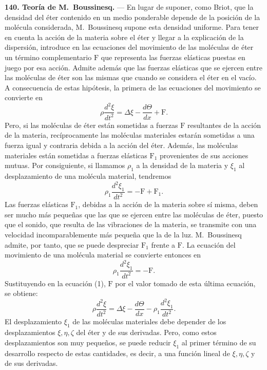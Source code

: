 \noindent\textbf{140. Teoría de M.~Boussinesq.} — En lugar de suponer,
como Briot, que la densidad del éter contenido en un medio ponderable
depende de la posición de la molécula considerada, M.~Boussinesq supone
esta densidad uniforme. Para tener en cuenta la acción de la materia sobre
el éter y llegar a la explicación de la dispersión, introduce en las
ecuaciones del movimiento de las moléculas de éter un término
complementario $\mathrm F$ que representa las fuerzas elásticas puestas en
juego por esa acción. Admite además que las fuerzas elásticas que se
ejercen entre las moléculas de éter son las mismas que cuando se considera
el éter en el vacío. A consecuencia de estas hipótesis, la primera de las
ecuaciones del movimiento se convierte en
\begin{equation}
\rho\frac{d^2\xi}{dt^2}=\Delta\xi-\frac{d\Theta}{dx}+\mathrm F.
\tag{1}
\end{equation}
Pero, si las moléculas de éter están sometidas a fuerzas $\mathrm F$
resultantes de la acción de la materia, recíprocamente las moléculas
materiales estarán sometidas a una fuerza igual y contraria debida a la
acción del éter. Además, las moléculas materiales están sometidas a
fuerzas elásticas $\mathrm F_1$ provenientes de sus acciones mutuas. Por
consiguiente, si llamamos $\rho_1$ a la densidad de la materia y $\xi_1$
al desplazamiento de una molécula material, tendremos
\[
\rho_1\frac{d^2\xi_1}{dt^2}=-\mathrm F+\mathrm F_1.
\]
Las fuerzas elásticas $\mathrm F_1$, debidas a la acción de la materia
sobre sí misma, deben ser mucho más pequeñas que las que se ejercen entre
las moléculas de éter, puesto que el sonido, que resulta de las
vibraciones de la materia, se transmite con una velocidad
incomparablemente más pequeña que la de la luz. M.~Boussinesq admite, por
tanto, que se puede despreciar $\mathrm F_1$ frente a $\mathrm F$. La
ecuación del movimiento de una molécula material se convierte entonces en
\begin{equation}
\rho_1\frac{d^2\xi_1}{dt^2}=-\mathrm F.
\tag{2}
\end{equation}
Sustituyendo en la ecuación (1), $\mathrm F$ por el valor tomado de esta
última ecuación, se obtiene:
\begin{equation}
\rho\frac{d^2\xi}{dt^2}=\Delta\xi-\frac{d\Theta}{dx}-\rho_1\frac{d^2\xi_1}{dt^2}.
\tag{3}
\end{equation}
El desplazamiento $\xi_1$ de las moléculas materiales debe depender de los
desplazamientos $\xi,\eta,\zeta$ del éter y de sus derivadas. Pero, como
estos desplazamientos son muy pequeños, se puede reducir $\xi_1$ al primer
término de su desarrollo respecto de estas cantidades, es decir, a una
función lineal de $\xi,\eta,\zeta$ y de sus derivadas.

